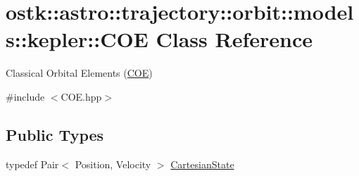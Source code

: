\hypertarget{classostk_1_1astro_1_1trajectory_1_1orbit_1_1models_1_1kepler_1_1_c_o_e}{}\section{ostk\+:\+:astro\+:\+:trajectory\+:\+:orbit\+:\+:models\+:\+:kepler\+:\+:C\+OE Class Reference}
\label{classostk_1_1astro_1_1trajectory_1_1orbit_1_1models_1_1kepler_1_1_c_o_e}


Classical Orbital Elements (\hyperlink{classostk_1_1astro_1_1trajectory_1_1orbit_1_1models_1_1kepler_1_1_c_o_e}{C\+OE})  




{\ttfamily \#include $<$C\+O\+E.\+hpp$>$}

\subsection*{Public Types}
\begin{DoxyCompactItemize}
\item 
typedef Pair$<$ Position, Velocity $>$ \hyperlink{classostk_1_1astro_1_1trajectory_1_1orbit_1_1models_1_1kepler_1_1_c_o_e_a410fdbf5aa25ed4651f1b7337c678edc}{Cartesian\+State}
\end{DoxyCompactItemize}
